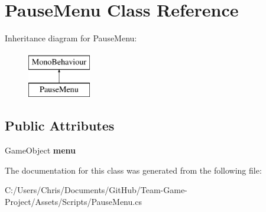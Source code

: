 \hypertarget{class_pause_menu}{}\section{Pause\+Menu Class Reference}
\label{class_pause_menu}
Inheritance diagram for Pause\+Menu\+:\begin{figure}[H]
\begin{center}
\leavevmode
\includegraphics[height=2.000000cm]{class_pause_menu}
\end{center}
\end{figure}
\subsection*{Public Attributes}
\begin{DoxyCompactItemize}
\item 
Game\+Object {\bfseries menu}\hypertarget{class_pause_menu_a82090cb093db2dcb357e32658a47bf1c}{}\label{class_pause_menu_a82090cb093db2dcb357e32658a47bf1c}

\end{DoxyCompactItemize}


The documentation for this class was generated from the following file\+:\begin{DoxyCompactItemize}
\item 
C\+:/\+Users/\+Chris/\+Documents/\+Git\+Hub/\+Team-\/\+Game-\/\+Project/\+Assets/\+Scripts/Pause\+Menu.\+cs\end{DoxyCompactItemize}
